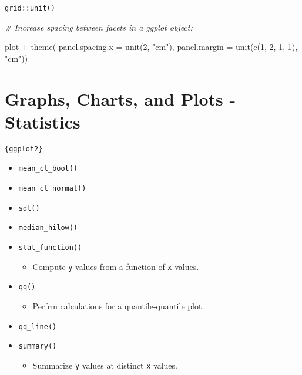 \documentclass[
]{book}
\newenvironment{Shaded}{\begin{snugshade}}{\end{snugshade}}
\newcommand{\AttributeTok}[1]{\textcolor[rgb]{0.77,0.63,0.00}{#1}}
\newcommand{\CommentTok}[1]{\textcolor[rgb]{0.56,0.35,0.01}{\textit{#1}}}
\newcommand{\DecValTok}[1]{\textcolor[rgb]{0.00,0.00,0.81}{#1}}
\newcommand{\FunctionTok}[1]{\textcolor[rgb]{0.00,0.00,0.00}{#1}}
\newcommand{\NormalTok}[1]{#1}
\newcommand{\SpecialCharTok}[1]{\textcolor[rgb]{0.00,0.00,0.00}{#1}}
\newcommand{\StringTok}[1]{\textcolor[rgb]{0.31,0.60,0.02}{#1}}
\providecommand{\tightlist}{%
  \setlength{\itemsep}{0pt}\setlength{\parskip}{0pt}}
\begin{document}
\texttt{grid::unit()}

\begin{Shaded}
\begin{Highlighting}[]
\CommentTok{\# Increase spacing between facets in a \textasciigrave{}ggplot\textasciigrave{} object:}

\NormalTok{plot }\SpecialCharTok{+} 
  \FunctionTok{theme}\NormalTok{(}
    \AttributeTok{panel.spacing.x =} \FunctionTok{unit}\NormalTok{(}\DecValTok{2}\NormalTok{, }\StringTok{"cm"}\NormalTok{),}
    \AttributeTok{panel.margin =} \FunctionTok{unit}\NormalTok{(}\FunctionTok{c}\NormalTok{(}\DecValTok{1}\NormalTok{, }\DecValTok{2}\NormalTok{, }\DecValTok{1}\NormalTok{, }\DecValTok{1}\NormalTok{), }\StringTok{"cm"}\NormalTok{))}
\end{Highlighting}
\end{Shaded}

\hypertarget{graphs-charts-and-plots---statistics}{%
\section{Graphs, Charts, and Plots - Statistics}\label{graphs-charts-and-plots---statistics}}

\texttt{\{ggplot2\}}

\begin{itemize}
\tightlist
\item
  \texttt{mean\_cl\_boot()}
\item
  \texttt{mean\_cl\_normal()}
\item
  \texttt{sdl()}
\item
  \texttt{median\_hilow()}
\item
  \texttt{stat\_function()}

  \begin{itemize}
  \tightlist
  \item
    Compute \texttt{y} values from a function of \texttt{x} values.
  \end{itemize}
\item
  \texttt{qq()}

  \begin{itemize}
  \tightlist
  \item
    Perfrm calculations for a quantile-quantile plot.
  \end{itemize}
\item
  \texttt{qq\_line()}
\item
  \texttt{summary()}

  \begin{itemize}
  \tightlist
  \item
    Summarize \texttt{y} values at distinct \texttt{x} values.
  \end{itemize}
\end{itemize}
\end{document}
